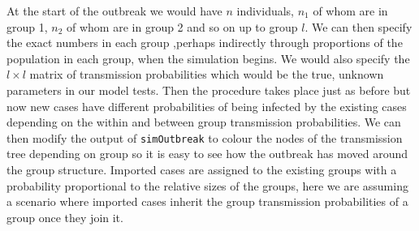 \documentclass[11pt,a4paper]{report}
\begin{document}
At the start of the outbreak we would have $n$ individuals, $n_1$ of whom are in group 1, $n_2$ of whom are in group 2 and so on up to group $l$. We can then specify the exact numbers in each group ,perhaps indirectly through proportions of the population in each group, when the simulation begins. We would also specify the $l \times l$ matrix of transmission probabilities which would be the true, unknown parameters in our model tests. Then the procedure takes place just as before but now new cases have different probabilities of being infected by the existing cases depending on the within and between group transmission probabilities. We can then modify the output of {\tt simOutbreak} to colour the nodes of the transmission tree depending on group so it is easy to see how the outbreak has moved around the group structure. Imported cases are assigned to the existing groups with a probability proportional to the relative sizes of the groups, here we are assuming a scenario where imported cases inherit the group transmission probabilities of a group once they join it.
\end{document}
